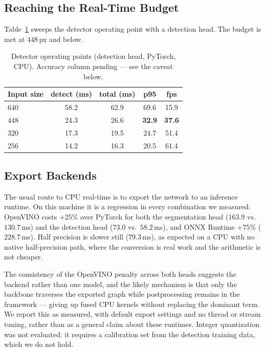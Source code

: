 \subsection{Reaching the Real-Time Budget}
\label{subsec:pareto}

Table~\ref{tab:pareto} sweeps the detector operating point with a detection
head.
The budget is met at $448$\,px and below.

\begin{table}[h]
  \centering
  \caption{Detector operating points (detection head, PyTorch, CPU).
           Accuracy column pending --- see the caveat below.}
  \label{tab:pareto}
  \begin{tabular}{lcccc}
    \toprule
    Input size & detect (ms) & total (ms) & p95 & fps \\
    \midrule
    $640$ & 58.2 & 62.9 & 69.6 & 15.9 \\
    $448$ & 24.3 & 26.6 & \textbf{32.9} & \textbf{37.6} \\
    $320$ & 17.3 & 19.5 & 24.7 & 51.4 \\
    $256$ & 14.2 & 16.3 & 20.5 & 61.4 \\
    \bottomrule
  \end{tabular}
\end{table}


\subsection{Export Backends}
\label{subsec:backends}

The usual route to CPU real-time is to export the network to an inference
runtime.
On this machine it is a regression in every combination we measured:
OpenVINO costs $+25\%$ over PyTorch for both the segmentation head
($163.9$ vs.\ $130.7$\,ms) and the detection head ($73.0$ vs.\ $58.2$\,ms),
and ONNX Runtime $+75\%$ ($228.7$\,ms).
Half precision is slower still ($79.3$\,ms), as expected on a CPU with no
native half-precision path, where the conversion is real work and the
arithmetic is not cheaper.

The consistency of the OpenVINO penalty across both heads suggests the
backend rather than one model, and the likely mechanism is that only the
backbone traverses the exported graph while postprocessing remains in the
framework --- giving up fused CPU kernels without replacing the dominant term.
We report this as measured, with default export settings and no thread or
stream tuning, rather than as a general claim about these runtimes.
Integer quantization was not evaluated: it requires a calibration set from the
detection training data, which we do not hold.


